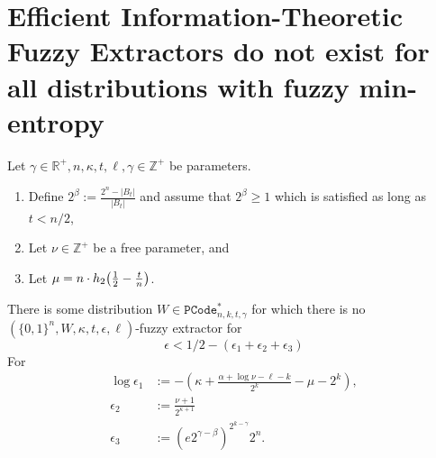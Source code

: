 

\section{Efficient Information-Theoretic Fuzzy Extractors do not exist for all distributions with fuzzy min-entropy}


\begin{theorem}
Let $\gamma \in\mathbb{R}^+, n, \kappa, t, \ell, \gamma \in\mathbb{Z}^+$ be parameters. 
\begin{enumerate}
\itemsep0em
\item Define $2^\beta:=\frac{2^n-|B_t|}{|B_t|}$ and assume that $2^\beta\ge 1$ which is  satisfied as long as $t< n/2 $,
\item Let $\nu \in \mathbb{Z}^+$ be a free parameter, and
\item Let $\mu =  n \cdot h_2\!\left(\frac{1}{2} - \frac{t}{n}\right)$.
\end{enumerate}
There is some distribution $W\in \mathtt{PCode}_{n, k, t, \gamma}^{*}$ for which there is no $(\{0,1\}^n, W, \kappa, t, \epsilon, \ell)$-fuzzy extractor for 
\[
\epsilon< 1/2 - (\epsilon_1+\epsilon_2+\epsilon_3)
\]
For 
\begin{align*}\log{\epsilon_1}&:= -\left(\kappa+\frac{\alpha +\log{\nu}-\ell-k}{2^k} - \mu -2^k\right),\\
\epsilon_2&:=\frac{\nu+1}{2^{\kappa+1}}\\
\epsilon_3&:=\left(e2^{\gamma-\beta}\right)^{2^{k-\gamma}}2^n.
\end{align*}
\label{thm:main theorem}
\end{theorem}

